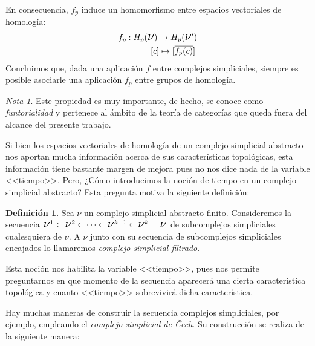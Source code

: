 \documentclass[12pt, a4paper, twoside]{book}
\numberwithin{equation}{section}
\theoremstyle{definition}
\newtheorem{defi}{Definición}
\theoremstyle{remark}
\newtheorem*{remark}{Nota}
\theoremstyle{plain}
\begin{document}
	En consecuencia, $\overline{f_{p}}$ induce un 
	homomorfismo entre espacios vectoriales de homología:	
		\begin{align*}
			\left.
			\begin{array}{l}
				f_{p}:H_{p}(\text{{\Large $\nu$}})\rightarrow 
				H_{p}(\text{{\Large $\nu$}}')\\[3pt] 
				\hspace{1.35cm} [c] \mapsto [\overline{f_{p}
				(c)}]
			\end{array}
			\right.
		\end{align*}
	Concluimos que, dada una aplicación $f$ entre complejos simpliciales, 
	siempre es posible asociarle una aplicación $f_{p}$ entre grupos de 
	homología.
	
	\begin{remark}
		Este propiedad es muy importante, de hecho, se conoce como 
		\emph{funtorialidad} y pertenece al ámbito de la teoría de 
		categorías que queda fuera del alcance del presente trabajo. 
	\end{remark}

	Si bien los espacios vectoriales de homología de un complejo 
	simplicial abstracto nos aportan mucha información acerca de sus 
	características topológicas, esta información tiene bastante margen de 
	mejora pues no nos dice nada de la variable <<tiempo>>. Pero, ¿Cómo 
	introducimos la noción de tiempo en un complejo simplicial abstracto? 
	Esta pregunta motiva la siguiente definición:

	\begin{defi}
		Sea {\Large $\nu$} un complejo simplicial abstracto finito. 
		Consideremos la secuencia $ \text{{\Large $\nu$}$^{1}$} 
		\subset \text{{\Large $\nu$}$^{2}$} \subset \cdots \subset
		\text{{\Large $\nu$}$^{k-1}$} \subset 
		\text{{\Large $\nu$}$^{k}$} = \text{{\Large $\nu$}}$ de 
		subcomplejos simpliciales cualesquiera de {\Large $\nu$}. A
		{\Large $\nu$} junto con su secuencia de subcomplejos 
		simpliciales encajados lo llamaremos \textit{complejo 
		simplicial filtrado}. 
	\end{defi}

	Esta noción nos habilita la variable <<tiempo>>, pues nos permite 
	preguntarnos en que momento de la secuencia aparecerá una cierta 
	característica topológica y cuanto <<tiempo>> sobrevivirá dicha 
	característica.

	Hay muchas maneras de construir la secuencia complejos simpliciales, 
	por ejemplo, empleando el \emph{complejo simplicial de Čech}. Su 
	construcción se realiza de la siguiente manera:
\end{document}
